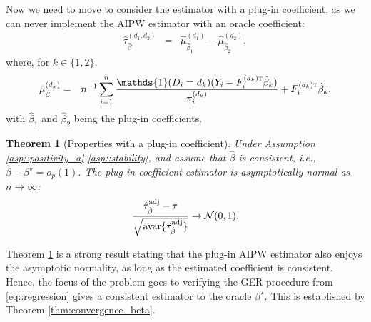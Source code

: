 \documentclass[twoside,letterpaper]{article}
\newcommand{\mathbbm}[1]{\mathds{#1}}
\theoremstyle{plain}
\newtheorem{theorem}{Theorem}[section]
\theoremstyle{definition}
\theoremstyle{remark}
\def\T{{\textsc{t}}}
\newcommand{\var}{\textup{var}}
\newcommand{\avar}{\textup{avar}}
\newcommand{\bY}{\boldsymbol{Y}}
\newcommand{\bX}{\boldsymbol{X}}
\newcommand{\bLambda}{\boldsymbol{\Lambda}}
\newcommand{\bPhi}{\boldsymbol{\Phi}}
\newcommand{\cN}{\mathcal{N}}
\newcommand{\indicator}{\mathbbm{1}}
\newcommand{\sumi}{\sum_{i=1}^n}
\begin{document}
Now we need to move to consider the estimator with a plug-in coefficient, as we can never implement the AIPW estimator with an oracle coefficient:
\begin{eqnarray*}
    \hat\tau{}^{(d_1, d_2)}_{\hat\beta} &=& \hat\mu{}^{(d_1)}_{\hat\beta_1} - \hat\mu{}^{(d_2)}_{\hat\beta_2},
\end{eqnarray*}
where, for $k \in \{1,2\}$,
\begin{eqnarray*}
    \hat\mu^{(d_k)}_{\hat\beta} &=& n^{-1}\sumi\frac{\indicator(D_i=d_k)(Y_i-F_i^{(d_k)\T} \hat\beta_k)}{\pi_i^{(d_k)}} + F_i^{(d_k)\T} \hat\beta_k.
\end{eqnarray*}
with $\hat\beta_1$ and $\hat\beta_2$ being the plug-in coefficients.  
\begin{theorem}[Properties with a plug-in coefficient]\label{thm:plug_in}
    Under Assumption \ref{asp::positivity_a}-\ref{asp::stability}, and assume that $\hat\beta$ is consistent, i.e., $\hat\beta - \beta^\star = o_p(1)$. The plug-in coefficient estimator is asymptotically normal as $n\to\infty$:
    \begin{eqnarray*}
        \frac{\hat\tau^{\textup{adj}}_{\hat{\beta}} - \tau}{\sqrt{\avar\{\hat\tau^{\textup{adj}}_{\hat\beta}\}}} \rightarrow \cN(0, 1).
    \end{eqnarray*}
\end{theorem}
Theorem \ref{thm:plug_in} is a strong result stating that the plug-in AIPW estimator also enjoys the asymptotic normality, as long as the estimated coefficient is consistent. Hence, the focus of the problem goes to verifying the GER procedure from \eqref{eq::regression} gives a consistent estimator to the oracle $\beta^\star$. This is established by Theorem \ref{thm:convergence_beta}. 


  

\end{document}
